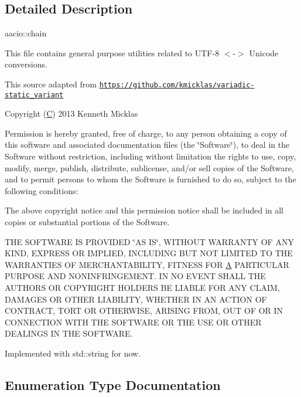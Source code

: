 \subsection{Detailed Description}
aacio\+::chain 

This file contains general purpose utilities related to U\+T\+F-\/8 $<$-\/$>$ Unicode conversions.

This source adapted from \href{https://github.com/kmicklas/variadic-static_variant}{\tt https\+://github.\+com/kmicklas/variadic-\/static\+\_\+variant}

Copyright (\mbox{\hyperlink{struct_c}{C}}) 2013 Kenneth Micklas

Permission is hereby granted, free of charge, to any person obtaining a copy of this software and associated documentation files (the \char`\"{}\+Software\char`\"{}), to deal in the Software without restriction, including without limitation the rights to use, copy, modify, merge, publish, distribute, sublicense, and/or sell copies of the Software, and to permit persons to whom the Software is furnished to do so, subject to the following conditions\+:

The above copyright notice and this permission notice shall be included in all copies or substantial portions of the Software.

T\+HE S\+O\+F\+T\+W\+A\+RE IS P\+R\+O\+V\+I\+D\+ED \char`\"{}\+A\+S I\+S\char`\"{}, W\+I\+T\+H\+O\+UT W\+A\+R\+R\+A\+N\+TY OF A\+NY K\+I\+ND, E\+X\+P\+R\+E\+SS OR I\+M\+P\+L\+I\+ED, I\+N\+C\+L\+U\+D\+I\+NG B\+UT N\+OT L\+I\+M\+I\+T\+ED TO T\+HE W\+A\+R\+R\+A\+N\+T\+I\+ES OF M\+E\+R\+C\+H\+A\+N\+T\+A\+B\+I\+L\+I\+TY, F\+I\+T\+N\+E\+SS F\+OR \mbox{\hyperlink{struct_a}{A}} P\+A\+R\+T\+I\+C\+U\+L\+AR P\+U\+R\+P\+O\+SE A\+ND N\+O\+N\+I\+N\+F\+R\+I\+N\+G\+E\+M\+E\+NT. IN NO E\+V\+E\+NT S\+H\+A\+LL T\+HE A\+U\+T\+H\+O\+RS OR C\+O\+P\+Y\+R\+I\+G\+HT H\+O\+L\+D\+E\+RS BE L\+I\+A\+B\+LE F\+OR A\+NY C\+L\+A\+IM, D\+A\+M\+A\+G\+ES OR O\+T\+H\+ER L\+I\+A\+B\+I\+L\+I\+TY, W\+H\+E\+T\+H\+ER IN AN A\+C\+T\+I\+ON OF C\+O\+N\+T\+R\+A\+CT, T\+O\+RT OR O\+T\+H\+E\+R\+W\+I\+SE, A\+R\+I\+S\+I\+NG F\+R\+OM, O\+UT OF OR IN C\+O\+N\+N\+E\+C\+T\+I\+ON W\+I\+TH T\+HE S\+O\+F\+T\+W\+A\+RE OR T\+HE U\+SE OR O\+T\+H\+ER D\+E\+A\+L\+I\+N\+GS IN T\+HE S\+O\+F\+T\+W\+A\+RE.

Implemented with std\+::string for now. 

\subsection{Enumeration Type Documentation}
\mbox{\label{namespacefc_ab52b42f18c442a260897c74c66c3d35c}} 
